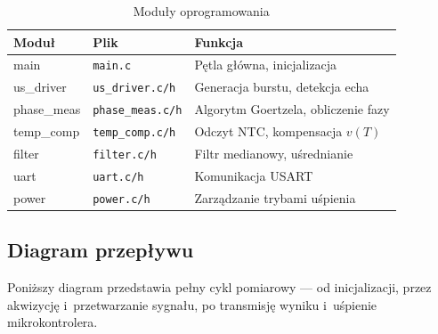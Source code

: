 \documentclass[a4paper,11pt]{article}
\begin{document}
\begin{table}[H]
    \centering
    \caption{Moduły oprogramowania}
    \label{tab:moduly_sw}
    \begin{tabular}{lll}
        \toprule
        \textbf{Moduł} & \textbf{Plik} & \textbf{Funkcja} \\
        \midrule
        main & \texttt{main.c} & Pętla główna, inicjalizacja \\
        us\_driver & \texttt{us\_driver.c/h} & Generacja burstu, detekcja echa \\
        phase\_meas & \texttt{phase\_meas.c/h} & Algorytm Goertzela, obliczenie fazy \\
        temp\_comp & \texttt{temp\_comp.c/h} & Odczyt NTC, kompensacja $v(T)$ \\
        filter & \texttt{filter.c/h} & Filtr medianowy, uśrednianie \\
        uart & \texttt{uart.c/h} & Komunikacja USART \\
        power & \texttt{power.c/h} & Zarządzanie trybami uśpienia \\
        \bottomrule
    \end{tabular}
\end{table}

\subsection{Diagram przepływu}

\noindent Poniższy diagram przedstawia pełny cykl pomiarowy --- od inicjalizacji,
przez akwizycję i~przetwarzanie sygnału, po transmisję wyniku i~uśpienie mikrokontrolera.
\end{document}
